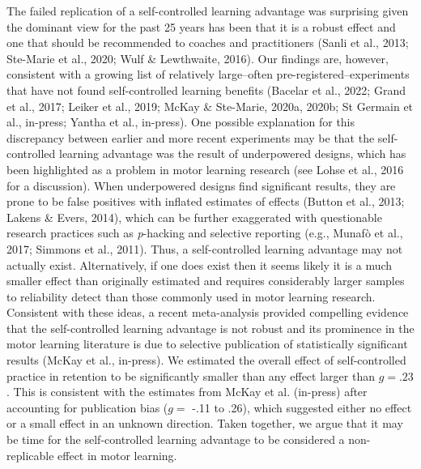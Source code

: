 \documentclass[
  man, donotrepeattitle,floatsintext]{apa7}
\begin{document}
The failed replication of a self-controlled learning advantage was surprising given the dominant view for the past 25 years has been that it is a robust effect and one that should be recommended to coaches and practitioners (Sanli et al., 2013; Ste-Marie et al., 2020; Wulf \& Lewthwaite, 2016). Our findings are, however, consistent with a growing list of relatively large--often pre-registered--experiments that have not found self-controlled learning benefits (Bacelar et al., 2022; Grand et al., 2017; Leiker et al., 2019; McKay \& Ste-Marie, 2020a, 2020b; St Germain et al., in-press; Yantha et al., in-press). One possible explanation for this discrepancy between earlier and more recent experiments may be that the self-controlled learning advantage was the result of underpowered designs, which has been highlighted as a problem in motor learning research (see Lohse et al., 2016 for a discussion). When underpowered designs find significant results, they are prone to be false positives with inflated estimates of effects (Button et al., 2013; Lakens \& Evers, 2014), which can be further exaggerated with questionable research practices such as \emph{p}-hacking and selective reporting (e.g., Munafò et al., 2017; Simmons et al., 2011). Thus, a self-controlled learning advantage may not actually exist. Alternatively, if one does exist then it seems likely it is a much smaller effect than originally estimated and requires considerably larger samples to reliability detect than those commonly used in motor learning research. Consistent with these ideas, a recent meta-analysis provided compelling evidence that the self-controlled learning advantage is not robust and its prominence in the motor learning literature is due to selective publication of statistically significant results (McKay et al., in-press). We estimated the overall effect of self-controlled practice in retention to be significantly smaller than any effect larger than \(g = .23\). This is consistent with the estimates from McKay et al. (in-press) after accounting for publication bias (\(g =\) -.11 to .26), which suggested either no effect or a small effect in an unknown direction. Taken together, we argue that it may be time for the self-controlled learning advantage to be considered a non-replicable effect in motor learning.
\end{document}

